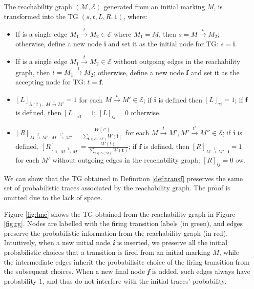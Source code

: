 \begin{definition}\label{def:transf}
The reachability graph $(\mathcal{M},\mathcal{E})$ generated from an initial marking $M$, is transformed into the TG $(s,t,L,R,1)$, where:
\begin{itemize}
	\item If is a single edge $M_1\overset{t}{\to}M_2\in\mathcal{E}$ where $M_1=M$, then $s=M\overset{t}{\to}M_2$; otherwise, define a new node $\textbf{i}$ and set it as the initial node for TG: $s=\textbf{i}$.
	\item If is a single edge $M_1\overset{t}{\to}M_2\in\mathcal{E}$ without outgoing edges in the reachability graph, then $t=M_1\overset{t}{\to}M_2$; otherwise, define a new node $\textbf{f}$ and set it as the accepting node for TG:  $t=\textbf{f}$.
	\item $[L]_{\lambda(t),\;M\overset{t}{\to} M'}=1$ for each $M\overset{t}{\to} M'\in\mathcal{E}$; if $\textbf{i}$ is defined then $[L]_{\tau\textbf{i}}=1$; if $\textbf{f}$ is defined, then $[L]_{\tau\textbf{f}}=1$; $[L]_{ij}=0$ otherwise.
	\item $[R]_{M\overset{t}{\to} M',\;M'\overset{t'}{\to} M''}=\frac{W(t')}{\sum_{\textbf{t}\in E(M')}W(\textbf{t})}$ for each $M\overset{t}{\to} M',M'\overset{t'}{\to} M''\in\mathcal{E}$; if $\textbf{i}$ is defined, $[R]_{\textbf{i},\;M\overset{t}{\to}M'}=\frac{W(t)}{\sum_{\textbf{t}\in E(M)}W(\textbf{t})}$; if $\textbf{f}$ is defined, then $[R]_{M\overset{t}{\to}M',\;\textbf{i}}=1$ for each $M'$ without outgoing edges in the reachability graph; $[R]_{ij}=0$ ow.
\end{itemize}
\end{definition}
%
We can show that the TG obtained in Definition \ref{def:transf} preserves the same set of probabilistic traces associated by the reachability graph. The proof is omitted due to the lack of space.

\begin{example}
Figure \ref{fig:lmc} shows the TG obtained from the reachability graph in Figure \ref{fig:rg}. Nodes are labelled with the firing 
transition labels (in green), and edges preserve the probabilistic information from the reachability graph (in red). Intuitively, when a 
new initial node \textit{\textbf{i}} is inserted, we preserve all the initial probabilistic choices that a transition is fired from an initial 
marking $M$, while the intermediate edges inherit the probabilisitc choice of the firing transition from the subsequent choices. When 
a new final node \textit{\textbf{f}} is added, such edges always have probability $1$, and thus do not interfere with the 
initial traces' probability.
\end{example}

